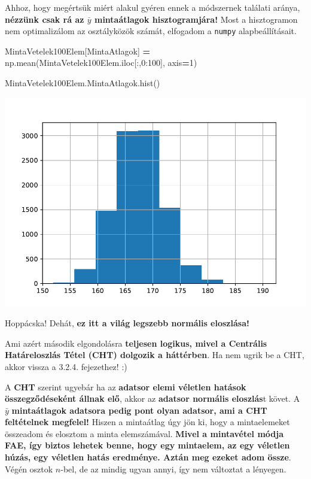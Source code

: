 \documentclass[
]{book}
\newenvironment{Shaded}{\begin{snugshade}}{\end{snugshade}}
\newcommand{\DecValTok}[1]{\textcolor[rgb]{0.00,0.00,0.81}{#1}}
\newcommand{\NormalTok}[1]{#1}
\newcommand{\OperatorTok}[1]{\textcolor[rgb]{0.81,0.36,0.00}{\textbf{#1}}}
\newcommand{\StringTok}[1]{\textcolor[rgb]{0.31,0.60,0.02}{#1}}
\begin{document}
Ahhoz, hogy megértsük miért alakul gyéren ennek a módszernek találati aránya, \textbf{nézzünk csak rá az \(\bar{y}\) mintaátlagok hisztogramjára!} Most a hisztogramon nem optimalizálom az osztályközök számát, elfogadom a \texttt{numpy} alapbeállításait.

\begin{Shaded}
\begin{Highlighting}[]
\NormalTok{MintaVetelek100Elem[}\StringTok{\textquotesingle{}MintaAtlagok\textquotesingle{}}\NormalTok{] }\OperatorTok{=}\NormalTok{ np.mean(MintaVetelek100Elem.iloc[:,}\DecValTok{0}\NormalTok{:}\DecValTok{100}\NormalTok{], axis}\OperatorTok{=}\DecValTok{1}\NormalTok{)}

\NormalTok{MintaVetelek100Elem.MintaAtlagok.hist()}
\end{Highlighting}
\end{Shaded}

\includegraphics{_main_files/figure-latex/unnamed-chunk-259-5.pdf}

Hoppácska! Dehát, \textbf{ez itt a világ legszebb normális eloszlása!}

Ami azért második elgondolásra \textbf{teljesen logikus, mivel a Centrális Határeloszlás Tétel (CHT) dolgozik a háttérben}. Ha nem ugrik be a CHT, akkor vissza a 3.2.4. fejezethez! :)

A \textbf{CHT} szerint ugyebár ha az \textbf{adatsor elemi véletlen hatások összegződéseként állnak elő}, akkor az \textbf{adatsor normális eloszlás}t követ. A \(\bar{y}\) \textbf{mintaátlagok adatsora pedig pont olyan adatsor, ami a CHT feltételnek megfelel!} Hiszen a mintaátlag úgy jön ki, hogy a mintaelemeket összeadom és elosztom a minta elemszámával. \textbf{Mivel a mintavétel módja FAE, így biztos lehetek benne, hogy egy mintaelem, az egy véletlen húzás, egy véletlen hatás eredménye. Aztán meg ezeket adom össze}. Végén osztok \(n\)-bel, de az mindig ugyan annyi, így nem változtat a lényegen.
\end{document}
